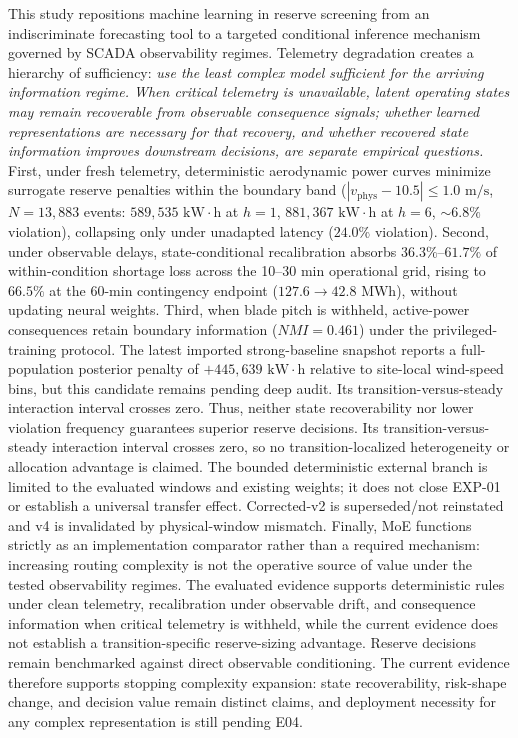 \documentclass[
  journal]{IEEEtran}
\begin{document}
This study repositions machine learning in reserve screening from an
indiscriminate forecasting tool to a targeted conditional inference
mechanism governed by SCADA observability regimes. Telemetry degradation
creates a hierarchy of sufficiency:
\textit{use the least complex model sufficient for the arriving information regime. When critical telemetry is unavailable, latent operating states may remain recoverable from observable consequence signals; whether learned representations are necessary for that recovery, and whether recovered state information improves downstream decisions, are separate empirical questions.}
First, under fresh telemetry, deterministic aerodynamic power curves
minimize surrogate reserve penalties within the boundary band
(\(|v_{\text{phys}}-10.5|\le 1.0\text{ m/s}\), \(N=13{,}883\) events:
\(589{,}535\text{ kW}\cdot\text{h}\) at \(h=1\),
\(881{,}367\text{ kW}\cdot\text{h}\) at \(h=6\), \(\sim 6.8\%\)
violation), collapsing only under unadapted latency (\(24.0\%\)
violation). Second, under observable delays, state-conditional
recalibration absorbs \(36.3\%\)--\(61.7\%\) of within-condition
shortage loss across the 10--30 min operational grid, rising to
\(66.5\%\) at the 60-min contingency endpoint
(\(127.6 \to 42.8\text{ MWh}\)), without updating neural weights. Third,
when blade pitch is withheld, active-power consequences retain boundary
information (\(NMI=0.461\)) under the privileged-training protocol. The
latest imported strong-baseline snapshot reports a full-population
posterior penalty of \(+445{,}639\text{ kW}\cdot\text{h}\) relative to
site-local wind-speed bins, but this candidate remains pending deep
audit. Its transition-versus-steady interaction interval crosses zero.
Thus, neither state recoverability nor lower violation frequency
guarantees superior reserve decisions. Its transition-versus-steady
interaction interval crosses zero, so no transition-localized
heterogeneity or allocation advantage is claimed. The bounded
deterministic external branch is limited to the evaluated windows and
existing weights; it does not close EXP-01 or establish a universal
transfer effect. Corrected-v2 is superseded/not reinstated and v4 is
invalidated by physical-window mismatch. Finally, MoE functions strictly
as an implementation comparator rather than a required mechanism:
increasing routing complexity is not the operative source of value under
the tested observability regimes. The evaluated evidence supports
deterministic rules under clean telemetry, recalibration under
observable drift, and consequence information when critical telemetry is
withheld, while the current evidence does not establish a
transition-specific reserve-sizing advantage. Reserve decisions remain
benchmarked against direct observable conditioning. The current evidence
therefore supports stopping complexity expansion: state recoverability,
risk-shape change, and decision value remain distinct claims, and
deployment necessity for any complex representation is still pending
E04.
\end{document}
